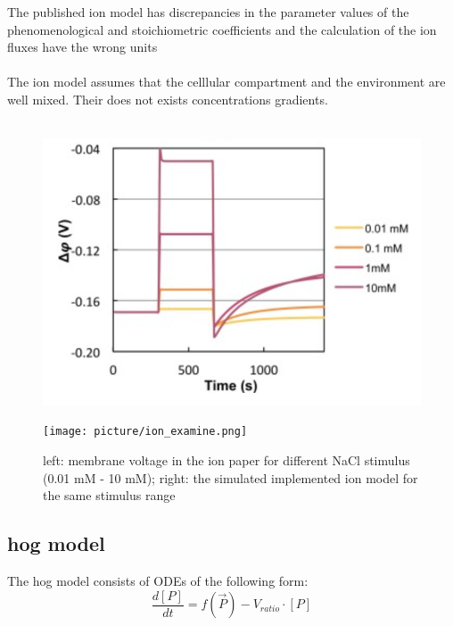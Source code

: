 The published ion model has discrepancies in the parameter values of the phenomenological and stoichiometric coefficients and the calculation of the ion fluxes have the wrong units \\\\
The ion model assumes that the celllular compartment and the environment are well mixed. Their does not exists concentrations gradients. \\\\
\begin{figure}[htbp]
	
	\begin{minipage}{0,5\textwidth}
		
		\includegraphics[width=\textwidth]{picture/Ion_Paper.png}
		
		\label{IonPaper} 
	\end{minipage}
	\begin{minipage}{0,5\textwidth}
		
		\texttt{[image: picture/ion\_examine.png]}
		
		\label{IonImplemented} 
	\end{minipage}
	\caption{left: membrane voltage in the ion paper for different NaCl stimulus (0.01 mM - 10 mM); right: the simulated implemented ion model for the same stimulus range }
\end{figure}

\subsection{hog model}
The hog model consists of ODEs of the following form:
\begin{equation}\label{VratioChange}
	\frac{d[P]}{dt} = f(\vec{P})-V_{ratio}\cdot [P]
\end{equation}


